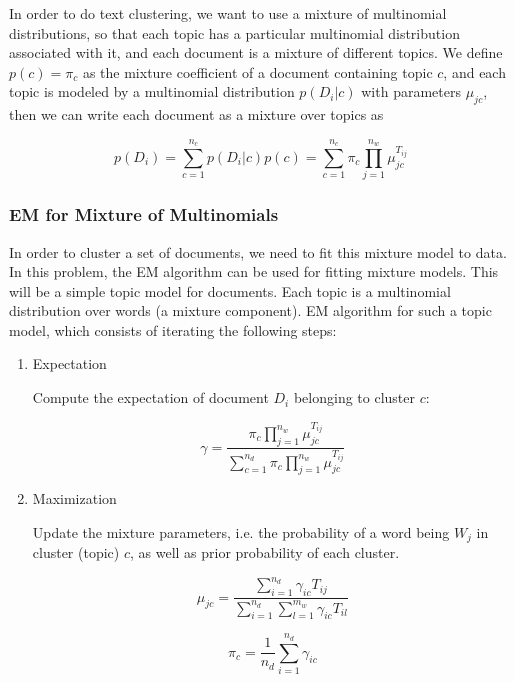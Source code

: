 \documentclass[twoside,10pt]{article}
\begin{document}
In order to do text clustering, we want to use a mixture of
multinomial distributions, so that each topic has a particular
multinomial distribution associated with it, and each document is a
mixture of different topics. We define $p(c) = \pi_c $  as the
mixture coefficient of a document containing topic $c$, and each topic
is modeled by a multinomial distribution $p(D_i|c)$ with parameters
$\mu_{jc}$, then we can write each document as a mixture over topics
as


\begin{equation}
p(D_i) = \sum_{c=1}^{n_c} p(D_i|c)p(c) = \sum_{c=1}^{n_c} \pi_c
\prod_{j=1}^{n_w} \mu_{jc}^{T_{ij}}\nonumber
\end{equation}

\subsubsection*{EM for Mixture of Multinomials}

In order to cluster a set of documents, we need to fit this mixture
model to data. In this problem, the EM algorithm can be used for
fitting mixture models. This will be a simple topic model for
documents. Each topic is a multinomial distribution over words (a
mixture component). EM algorithm for such a topic model, which
consists of iterating the following steps:

\begin{enumerate}
\item Expectation

Compute the expectation of document $D_i$ belonging to cluster $c$:

\begin{equation}
\gamma =  \frac{\pi_c \prod_{j=1}^{n_w}
\mu_{jc}^{T_{ij}}}{\sum_{c=1}^{n_d} \pi_c \prod_{j=1}^{n_w}
\mu_{jc}^{T_{ij}}}\nonumber
\end{equation}

\item Maximization

Update the mixture parameters, i.e. the probability of a word being
$W_j$ in cluster (topic) $c$, as well as prior probability of each
cluster.


\begin{equation}
\mu_{jc} =
\frac{\sum_{i=1}^{n_d}\gamma_{ic}T_{ij}}{\sum_{i=1}^{n_d}\sum_{l=1}^{m_w}
\gamma_{ic}T_{il}}\nonumber
\end{equation}

\begin{equation}
 \pi_c = \frac{1}{n_d}
\sum_{i=1}^{n_d}\gamma_{ic}\nonumber
\end{equation}

\end{enumerate}
\end{document}
